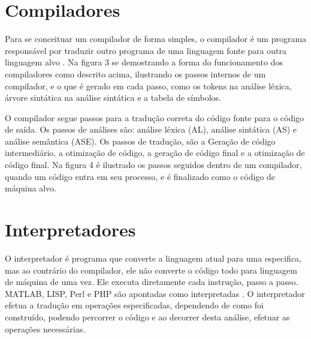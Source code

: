 \documentclass[12pt,oneside,a4paper,chapter=TITLE,section=TITLE,sumario=tradicional]{abntex2}
\begin{document}
\begin{figure}[htb]
\end{figure}

\section{Compiladores}
\label{sec:compiladores}

Para se conceituar um compilador de forma simples, o compilador é um programa responsável por traduzir outro programa de uma linguagem fonte para outra linguagem alvo \cite{alfred1995}. Na figura 3 se demostrando a forma do funcionamento dos compiladores como descrito acima, ilustrando os passos internos de um compilador, e o que é gerado em cada passo, como os tokens na análise léxica, árvore sintática na análise sintática e a tabela de símbolos.

\begin{figure}[htb]
\end{figure}

O compilador segue passos para a tradução correta do código fonte para o código de saída. Os passos de análises são: análise léxica (AL), análise sintática (AS) e análise semântica (ASE). Os passos de tradução, são a Geração de código intermediário, a otimização de código, a geração de código final e a otimização de código final. Na figura 4 é ilustrado os passos seguidos dentro de um compilador, quando um código entra em seu processo, e é finalizado como o código de máquina alvo.

\begin{figure}[htb]
\end{figure}


\section{Interpretadores}
\label{sec:interpretadores}

O interpretador é programa que converte a linguagem atual para uma especifica, mas ao contrário do compilador, ele não converte o código todo para linguagem de máquina de uma vez. Ele executa diretamente cada instrução, passo a passo. MATLAB, LISP, Perl e PHP são apontadas como interpretadas \cite{penelope2019}.  O interpretador efetua a tradução em operações especificadas, dependendo de como foi construído, podendo percorrer o código e ao decorrer desta análise, efetuar as operações necessárias. 
\end{document}
